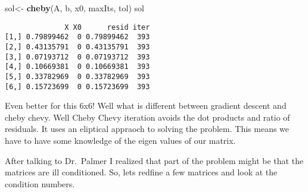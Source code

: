 \documentclass[]{article}
\newenvironment{Shaded}{\begin{snugshade}}{\end{snugshade}}
\newcommand{\KeywordTok}[1]{\textcolor[rgb]{0.13,0.29,0.53}{\textbf{#1}}}
\newcommand{\DataTypeTok}[1]{\textcolor[rgb]{0.13,0.29,0.53}{#1}}
\newcommand{\DecValTok}[1]{\textcolor[rgb]{0.00,0.00,0.81}{#1}}
\newcommand{\FloatTok}[1]{\textcolor[rgb]{0.00,0.00,0.81}{#1}}
\newcommand{\StringTok}[1]{\textcolor[rgb]{0.31,0.60,0.02}{#1}}
\newcommand{\CommentTok}[1]{\textcolor[rgb]{0.56,0.35,0.01}{\textit{#1}}}
\newcommand{\OperatorTok}[1]{\textcolor[rgb]{0.81,0.36,0.00}{\textbf{#1}}}
\newcommand{\NormalTok}[1]{#1}
\begin{document}
\begin{Shaded}
\begin{Highlighting}[]
\NormalTok{sol<-}\StringTok{ }\KeywordTok{cheby}\NormalTok{(A, b, x0, maxIts, tol)}
\NormalTok{sol}
\end{Highlighting}
\end{Shaded}

\begin{verbatim}
              X X0      resid iter
[1,] 0.79899462  0 0.79899462  393
[2,] 0.43135791  0 0.43135791  393
[3,] 0.07193712  0 0.07193712  393
[4,] 0.10669381  0 0.10669381  393
[5,] 0.33782969  0 0.33782969  393
[6,] 0.15723699  0 0.15723699  393
\end{verbatim}

Even better for this 6x6! Well what is different between gradient
descent and cheby chevy. Well Cheby Chevy iteration avoids the dot
products and ratio of residuals. It uses an eliptical appraoch to
solving the problem. This means we have to have some knowledge of the
eigen values of our matrix.

After talking to Dr.~Palmer I realized that part of the problem might be
that the matrices are ill conditioned. So, lets redfine a few matrices
and look at the condition numbers.

\begin{Shaded}
\end{Shaded}
\end{document}

